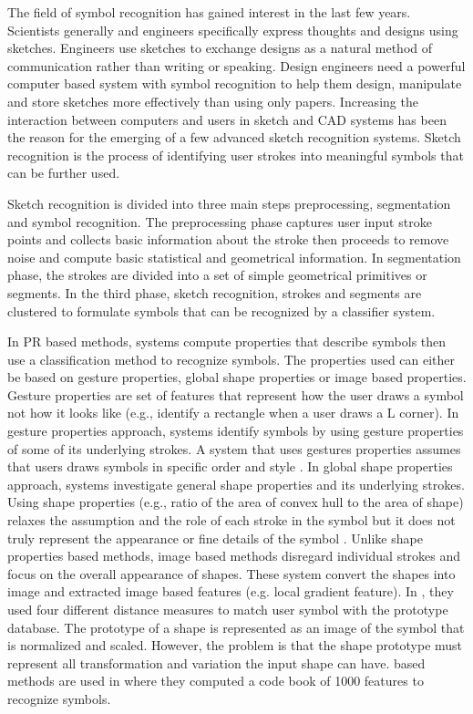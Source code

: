 \documentclass[preprint,1p,times,review]{elsarticle}
\begin{document}
The field of symbol recognition has gained interest in the last few years.
Scientists generally and engineers specifically express thoughts and designs
using sketches. Engineers use sketches to exchange designs as a natural method
of communication rather than writing or speaking. Design engineers need a
powerful computer based system with symbol recognition to help them design,
manipulate and store sketches more effectively than using only papers.
Increasing the interaction between computers and users in sketch and CAD systems
has been the reason for the emerging of a few advanced sketch recognition
systems. Sketch recognition is the process of identifying user strokes into
meaningful symbols that can be further used.

Sketch recognition is divided into three main steps preprocessing, segmentation
and symbol recognition. The preprocessing phase captures user input stroke
points and collects basic information about the stroke then proceeds to remove
noise and compute basic statistical and geometrical information. In segmentation
phase, the strokes are divided into a set of simple geometrical primitives or
segments. In the third phase, sketch recognition, strokes and segments are
clustered to formulate symbols that can be recognized by a classifier system.



In PR based methods, systems compute properties that describe symbols then use a
classification method to recognize symbols. The properties used can either be
based on gesture properties, global shape properties or image based properties.
Gesture properties are set of features that represent how the user draws a
symbol not how it looks like (e.g., identify a rectangle when a user draws a L
corner). In gesture properties approach, systems identify symbols by using
gesture properties of some of its underlying strokes. A system that uses
gestures properties assumes that users draws symbols in specific order and style
\cite{gestureexample12,aideddesgin22}. In global shape properties approach,
systems investigate general shape properties and its underlying strokes. Using
shape properties (e.g., ratio of the area of convex hull to the area of shape)
relaxes the assumption and the role of each stroke in the symbol but it does not
truly represent the appearance or fine details of the symbol
\cite{DiagramOfflineConvexHull,Cali63}. Unlike shape properties based methods,
image based methods disregard individual strokes and focus on the overall
appearance of shapes. These system convert the shapes into image and extracted
image based features (e.g. local gradient
feature)\cite{Oltmans07,imagetrainable48}. In \cite{imagetrainable48}, they used
four different distance measures to match user symbol with the prototype
database. The prototype of a shape is represented as an image of the symbol that
is normalized and scaled.  However, the problem is that the shape prototype must
represent all transformation and variation the input shape can have.   %
based methods are used in \cite{Oltmans07,imagetrainable48} where they computed
a code book of 1000 features to recognize symbols.
\end{document}
